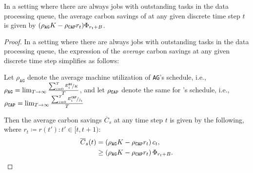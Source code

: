 \begin{cor} \label{cor:ksCarbonSavingsContinuous}
In a setting where there are always jobs with outstanding tasks in the data processing queue, the average carbon savings of \CAP at any given discrete time step $t$ is given by $(\rho_{\texttt{AG}} K - \rho_{\texttt{CAP}} r_t ) \Phi_{r_t + B}$.
\end{cor}
\begin{proof}
In a setting where there are always jobs with outstanding tasks in the data processing queue, the expression of the \textit{average} carbon savings at any given discrete time step simplifies as follows:

Let $\rho_{\texttt{AG}}$ denote the average machine utilization of \texttt{AG}'s schedule, i.e., $\rho_{\texttt{AG}} = \lim_{T\to \infty} \frac{\sum_{i=0}^T \nicefrac{E^\texttt{AG}_i}{K}}{T}$, and let $\rho_{\texttt{CAP}}$ denote the same for \CAP's schedule, i.e., $\rho_{\texttt{CAP}} = \lim_{T\to \infty} \frac{\sum_{i=0}^T \nicefrac{E^\texttt{CAP}_i}{j_i}}{T}$

Then the average carbon savings $\overline{C}_s$ at  any time step $t$ is given by the following, where $r_t \coloneqq r(t') : t' \in [t, t+1)$:
\begin{align*}
\overline{C}_s(t) &= \left(\rho_{\texttt{AG}} K - \rho_{\texttt{CAP}} r_t \right) c_t, \\
& \ge \left(\rho_{\texttt{AG}} K - \rho_{\texttt{CAP}} r_t \right) \Phi_{r_t + B}.
\end{align*}
\end{proof}

